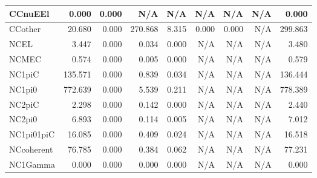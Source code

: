 \begin{table}
\begin{adjustbox}{width=1\textwidth}
\begin{tabular} {  l r  r  r  r  r  r  r  r  }
        \\ \hline
 CCnuEEl      & 0.000                & 0.000                & N/A                  & N/A                  & N/A                  & N/A                  & N/A                  & 0.000        
        \\ \hline
 CCother      & 20.680               & 0.000                & 270.868              & 8.315                & 0.000                & 0.000                & N/A                  & 299.863      
        \\ \hline
 NCEL         & 3.447                & 0.000                & 0.034                & 0.000                & N/A                  & N/A                  & N/A                  & 3.480        
        \\ \hline
 NCMEC        & 0.574                & 0.000                & 0.005                & 0.000                & N/A                  & N/A                  & N/A                  & 0.579        
        \\ \hline
 NC1piC       & 135.571              & 0.000                & 0.839                & 0.034                & N/A                  & N/A                  & N/A                  & 136.444      
        \\ \hline
 NC1pi0       & 772.639              & 0.000                & 5.539                & 0.211                & N/A                  & N/A                  & N/A                  & 778.389      
        \\ \hline
 NC2piC       & 2.298                & 0.000                & 0.142                & 0.000                & N/A                  & N/A                  & N/A                  & 2.440        
        \\ \hline
 NC2pi0       & 6.893                & 0.000                & 0.114                & 0.005                & N/A                  & N/A                  & N/A                  & 7.012        
        \\ \hline
 NC1pi01piC   & 16.085               & 0.000                & 0.409                & 0.024                & N/A                  & N/A                  & N/A                  & 16.518       
        \\ \hline
NCcoherent   & 76.785               & 0.000                & 0.384                & 0.062                & N/A                  & N/A                  & N/A                  & 77.231       
        \\ \hline
 NC1Gamma     & 0.000                & 0.000                & 0.000                & 0.000                & N/A                  & N/A                  & N/A                  & 0.000        

\end{tabular}
\end{adjustbox}
\end{table}
